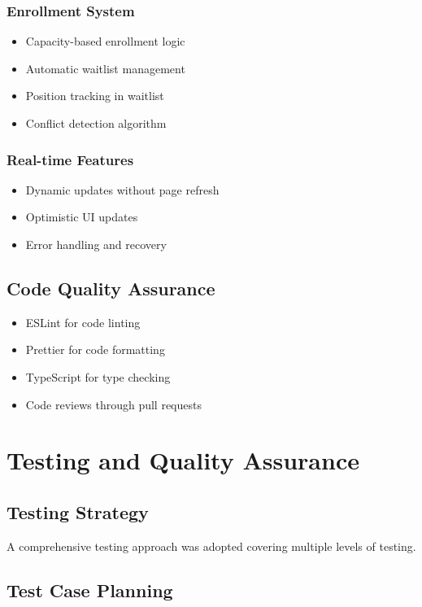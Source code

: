 \documentclass[12pt,a4paper]{report}
\begin{document}
\subsection{Enrollment System}
\begin{itemize}[leftmargin=*]
    \item Capacity-based enrollment logic
    \item Automatic waitlist management
    \item Position tracking in waitlist
    \item Conflict detection algorithm
\end{itemize}

\subsection{Real-time Features}
\begin{itemize}[leftmargin=*]
    \item Dynamic updates without page refresh
    \item Optimistic UI updates
    \item Error handling and recovery
\end{itemize}

\section{Code Quality Assurance}
\begin{itemize}[leftmargin=*]
    \item ESLint for code linting
    \item Prettier for code formatting
    \item TypeScript for type checking
    \item Code reviews through pull requests
\end{itemize}

\chapter{Testing and Quality Assurance}

\section{Testing Strategy}
A comprehensive testing approach was adopted covering multiple levels of testing.

\section{Test Case Planning}
\end{document}
